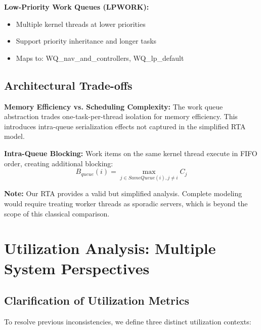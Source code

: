\documentclass[12pt,a4paper]{article}
\begin{document}
\textbf{Low-Priority Work Queues (LPWORK):}
\begin{itemize}
\item Multiple kernel threads at lower priorities
\item Support priority inheritance and longer tasks
\item Maps to: WQ\_nav\_and\_controllers, WQ\_lp\_default
\end{itemize}

\subsection{Architectural Trade-offs}

\textbf{Memory Efficiency vs. Scheduling Complexity:}
The work queue abstraction trades one-task-per-thread isolation for memory efficiency. This introduces intra-queue serialization effects not captured in the simplified RTA model.

\textbf{Intra-Queue Blocking:} Work items on the same kernel thread execute in FIFO order, creating additional blocking:
\begin{equation}
B_{queue}(i) = \max_{j \in SameQueue(i), j \neq i} C_j
\end{equation}

\textbf{Note:} Our RTA provides a valid but simplified analysis. Complete modeling would require treating worker threads as sporadic servers, which is beyond the scope of this classical comparison.

\section{Utilization Analysis: Multiple System Perspectives}

\subsection{Clarification of Utilization Metrics}

To resolve previous inconsistencies, we define three distinct utilization contexts:
\end{document}
